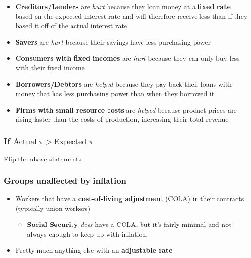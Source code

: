 \documentclass[
  letterpaper,
  DIV=11,
  numbers=noendperiod]{scrartcl}
\providecommand{\tightlist}{%
  \setlength{\itemsep}{0pt}\setlength{\parskip}{0pt}}\usepackage{longtable,booktabs,array}
\begin{document}
\begin{itemize}
\tightlist
\item
  \textbf{Creditors/Lenders} are \emph{hurt} because they loan money at
  a \textbf{fixed rate} based on the expected interest rate and will
  therefore receive less than if they based it off of the actual
  interest rate
\item
  \textbf{Savers} are \emph{hurt} because their savings have less
  purchasing power
\item
  \textbf{Consumers with fixed incomes} are \emph{hurt} because they can
  only buy less with their fixed income
\item
  \textbf{Borrowers/Debtors} are \emph{helped} because they pay back
  their loans with money that has less purchasing power than when they
  borrowed it
\item
  \textbf{Firms with small resource costs} are \emph{helped} because
  product prices are rising faster than the costs of production,
  increasing their total revenue
\end{itemize}

\subsubsection{\texorpdfstring{If
\(\text{Actual } \pi > \text{Expected } \pi\)}{If \textbackslash text\{Actual \} \textbackslash pi \textgreater{} \textbackslash text\{Expected \} \textbackslash pi}}\label{if-textactual-pi-textexpected-pi}

Flip the above statements.

\subsubsection{Groups unaffected by
inflation}\label{groups-unaffected-by-inflation}

\begin{itemize}
\tightlist
\item
  Workers that have a \textbf{cost-of-living adjustment} (COLA) in their
  contracts (typically union workers)

  \begin{itemize}
  \tightlist
  \item
    \textbf{Social Security} \emph{does} have a COLA, but it's fairly
    minimal and not always enough to keep up with inflation.
  \end{itemize}
\item
  Pretty much anything else with an \textbf{adjustable rate}
\end{itemize}
\end{document}
